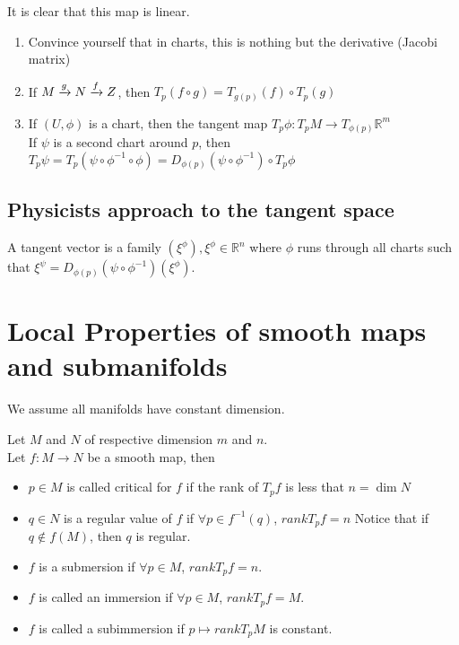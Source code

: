 \documentclass[../main.tex]{subfiles}
\begin{document}
It is clear that this map is linear.
\begin{rmq}
\begin{enumerate}
\item Convince yourself that in charts, this is nothing but the derivative (Jacobi matrix) 
\item If $ M\xrightarrow{g} N \xrightarrow{f} Z$, then $T_{p} ( f\circ g ) = T_{g( p) }  ( f) \circ T_{ p} (g ) $ 
\item If $( U,\phi) $ is a chart, then the tangent map $T_p \phi: T_p M \to T_{\phi( p) } \mathbb{R}^{m} $ \\
	If $\psi$ is a second chart around $p$, then $T_p \psi= T_p( \psi\circ\phi^{-1}\circ\phi) = D_{\phi( p) } ( \psi\circ\phi^{-1}) \circ T_p \phi$ 
\end{enumerate}
\end{rmq}
\subsection*{Physicists approach to the tangent space}
A tangent vector is a family $( \xi^{\phi}), \xi^{\phi}\in \mathbb{R}^n$ where $\phi$ runs through all charts such that $ \xi^{\psi}= D_{\phi( p) } ( \psi\circ\phi^{-1}) ( \xi^{\phi}) $.
\section{Local Properties of smooth maps and submanifolds}
We assume all manifolds have constant dimension.
\begin{defn}
	Let $M$ and $N$ of respective dimension $m$ and $n$.\\
	Let $f:M\to N$ be a smooth map, then
	\begin{itemize}
	\item $p\in M$ is called critical for $f$ if the rank of $T_p f$ is less that $n = \dim N$ 
	\item $q\in N$ is a regular value of $f$ if $\forall p \in f^{-1}( q) $, $rank T_p f =n$ 
		Notice that if $q\notin f( M) $, then $q$ is regular.
	\item $f$ is a submersion if $\forall p \in M$, $rank T_p f =n$.
	\item $f$ is called an immersion if $\forall p\in M$, $rank T_p f = M$.
	\item $f$ is called a subimmersion if $p \mapsto rank T_p M$ is constant.
	\end{itemize}
	
\end{defn}
	
\end{document}
